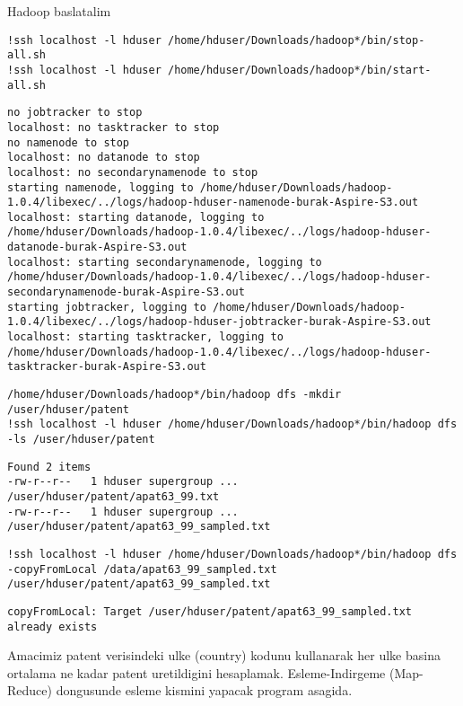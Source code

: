 \documentclass[12pt,fleqn]{article}\usepackage{../common}
\begin{document}
Hadoop baslatalim

\begin{verbatim}
!ssh localhost -l hduser /home/hduser/Downloads/hadoop*/bin/stop-all.sh
!ssh localhost -l hduser /home/hduser/Downloads/hadoop*/bin/start-all.sh
\end{verbatim}

\begin{verbatim}
no jobtracker to stop
localhost: no tasktracker to stop
no namenode to stop
localhost: no datanode to stop
localhost: no secondarynamenode to stop
starting namenode, logging to /home/hduser/Downloads/hadoop-1.0.4/libexec/../logs/hadoop-hduser-namenode-burak-Aspire-S3.out
localhost: starting datanode, logging to /home/hduser/Downloads/hadoop-1.0.4/libexec/../logs/hadoop-hduser-datanode-burak-Aspire-S3.out
localhost: starting secondarynamenode, logging to /home/hduser/Downloads/hadoop-1.0.4/libexec/../logs/hadoop-hduser-secondarynamenode-burak-Aspire-S3.out
starting jobtracker, logging to /home/hduser/Downloads/hadoop-1.0.4/libexec/../logs/hadoop-hduser-jobtracker-burak-Aspire-S3.out
localhost: starting tasktracker, logging to /home/hduser/Downloads/hadoop-1.0.4/libexec/../logs/hadoop-hduser-tasktracker-burak-Aspire-S3.out
\end{verbatim}

\begin{verbatim}
/home/hduser/Downloads/hadoop*/bin/hadoop dfs -mkdir /user/hduser/patent
!ssh localhost -l hduser /home/hduser/Downloads/hadoop*/bin/hadoop dfs -ls /user/hduser/patent
\end{verbatim}

\begin{verbatim}
Found 2 items
-rw-r--r--   1 hduser supergroup ...  /user/hduser/patent/apat63_99.txt
-rw-r--r--   1 hduser supergroup ...   /user/hduser/patent/apat63_99_sampled.txt
\end{verbatim}

\begin{verbatim}
!ssh localhost -l hduser /home/hduser/Downloads/hadoop*/bin/hadoop dfs -copyFromLocal /data/apat63_99_sampled.txt /user/hduser/patent/apat63_99_sampled.txt
\end{verbatim}

\begin{verbatim}
copyFromLocal: Target /user/hduser/patent/apat63_99_sampled.txt already exists
\end{verbatim}

Amacimiz patent verisindeki ulke (country) kodunu kullanarak her ulke
basina ortalama ne kadar patent uretildigini
hesaplamak. Esleme-Indirgeme (Map-Reduce) dongusunde esleme kismini
yapacak program asagida.
\end{document}
